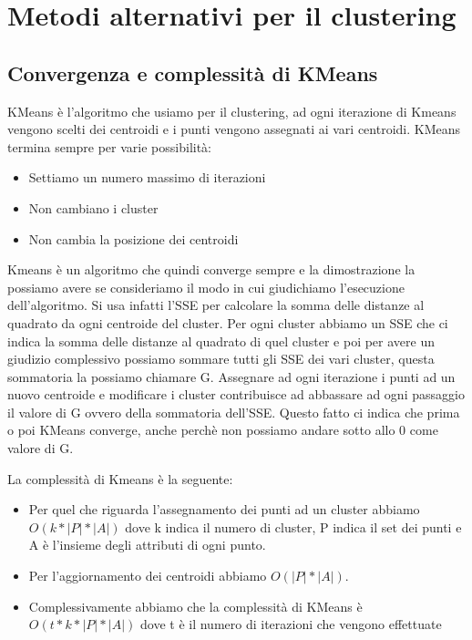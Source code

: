 \documentclass[14pt]{extreport}
\begin{document}
\chapter{Metodi alternativi per il clustering}

\section{Convergenza e complessità di KMeans}

KMeans è l'algoritmo che usiamo per il clustering, ad ogni iterazione di Kmeans vengono scelti dei centroidi e i punti vengono assegnati ai vari centroidi.
KMeans termina sempre per varie possibilità:
\begin{itemize}
    \item Settiamo un numero massimo di iterazioni
    \item Non cambiano i cluster
    \item Non cambia la posizione dei centroidi
\end{itemize}

Kmeans è un algoritmo che quindi converge sempre e la dimostrazione la possiamo avere se consideriamo il modo in cui giudichiamo l'esecuzione dell'algoritmo. Si usa infatti l'SSE per calcolare la somma delle distanze al quadrato da ogni centroide del cluster.
Per ogni cluster abbiamo un SSE che ci indica la somma delle distanze al quadrato di quel cluster e poi per avere un giudizio complessivo possiamo sommare tutti gli SSE dei vari cluster, questa sommatoria la possiamo chiamare G.
Assegnare ad ogni iterazione i punti ad un nuovo centroide e modificare i cluster contribuisce ad abbassare ad ogni passaggio il valore di G ovvero della sommatoria dell'SSE.
Questo fatto ci indica che prima o poi KMeans converge, anche perchè non possiamo andare sotto allo 0 come valore di G.

La complessità di Kmeans è la seguente:
\begin{itemize}
    \item Per quel che riguarda l'assegnamento dei punti ad un cluster abbiamo $O(k*|P|*|A|)$ dove k indica il numero di cluster, P indica il set dei punti e A è l'insieme degli attributi di ogni punto.
    \item Per l'aggiornamento dei centroidi abbiamo $O(|P|*|A|)$.
    \item Complessivamente abbiamo che la complessità di KMeans è $O(t*k*|P|*|A|)$ dove t è il numero di iterazioni che vengono effettuate
\end{itemize}
\end{document}
